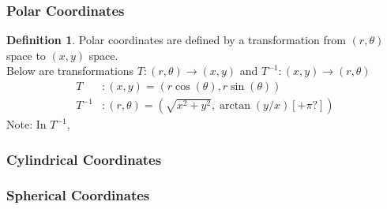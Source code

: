 \documentclass[11pt]{article}
\theoremstyle{definition}
\newtheorem{definition}[theorem]{Definition}
\begin{document}
\subsubsection{Polar Coordinates}
\begin{definition}
Polar coordinates are defined by a transformation from $(r, \theta)$ space
to $(x,y)$ space. \\
Below are transformations $T: (r, \theta) \to (x,y)$ and $T^{-1}: (x,y) \to
(r,\theta)$
\begin{align*}
    T&: (x,y) = (r\cos(\theta),r\sin(\theta)) \\
    T^{-1}&: (r,\theta) = (\sqrt{x^2+y^2},\arctan(y/x)[+\pi?])
\end{align*}
Note: In $T^{-1}, $
\end{definition}
\subsubsection{Cylindrical Coordinates}
\subsubsection{Spherical Coordinates}
\end{document}
